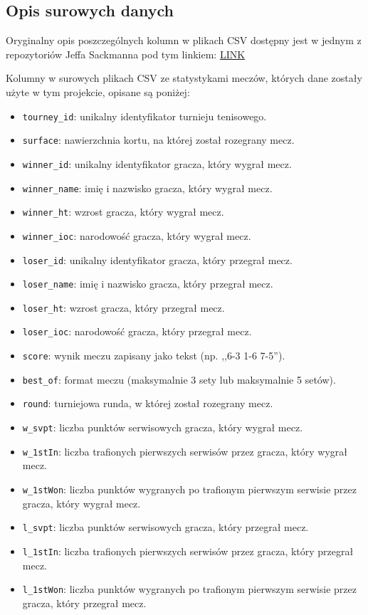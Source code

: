 \documentclass[12pt, a4paper]{article}
\begin{document}
\begin{appendices}
\renewcommand{\appendixname}{Załącznik}

\section{Opis surowych danych} \label{sec:raw_data_description}
Oryginalny opis poszczególnych kolumn w plikach CSV dostępny jest w jednym z repozytoriów Jeffa Sackmanna \cite{tennis_atp} pod tym linkiem:
\href{https://github.com/JeffSackmann/tennis_atp/blob/master/matches_data_dictionary.txt}{LINK}

Kolumny w surowych plikach CSV ze statystykami meczów, których dane zostały użyte w tym projekcie, opisane są poniżej:
\begin{itemize}
    \item \verb|tourney_id|: unikalny identyfikator turnieju tenisowego.
    \item \verb|surface|: nawierzchnia kortu, na której został rozegrany mecz.
    \item \verb|winner_id|: unikalny identyfikator gracza, który wygrał mecz.
    \item \verb|winner_name|: imię i nazwisko gracza, który wygrał mecz.
    \item \verb|winner_ht|: wzrost gracza, który wygrał mecz.
    \item \verb|winner_ioc|: narodowość gracza, który wygrał mecz.
    \item \verb|loser_id|: unikalny identyfikator gracza, który przegrał mecz.
    \item \verb|loser_name|: imię i nazwisko gracza, który przegrał mecz.
    \item \verb|loser_ht|: wzrost gracza, który przegrał mecz.
    \item \verb|loser_ioc|: narodowość gracza, który przegrał mecz.
    \item \verb|score|: wynik meczu zapisany jako tekst (np. ,,6-3 1-6 7-5'').
    \item \verb|best_of|: format meczu (maksymalnie 3 sety lub maksymalnie 5 setów).
    \item \verb|round|: turniejowa runda, w której został rozegrany mecz.
    \item \verb|w_svpt|: liczba punktów serwisowych gracza, który wygrał mecz.
    \item \verb|w_1stIn|: liczba trafionych pierwszych serwisów przez gracza, który wygrał mecz.
    \item \verb|w_1stWon|: liczba punktów wygranych po trafionym pierwszym serwisie przez gracza, który wygrał mecz.
    \item \verb|l_svpt|: liczba punktów serwisowych gracza, który przegrał mecz.
    \item \verb|l_1stIn|: liczba trafionych pierwszych serwisów przez gracza, który przegrał mecz.
    \item \verb|l_1stWon|: liczba punktów wygranych po trafionym pierwszym serwisie przez gracza, który przegrał mecz.
\end{itemize}
\end{appendices}
\end{document}
